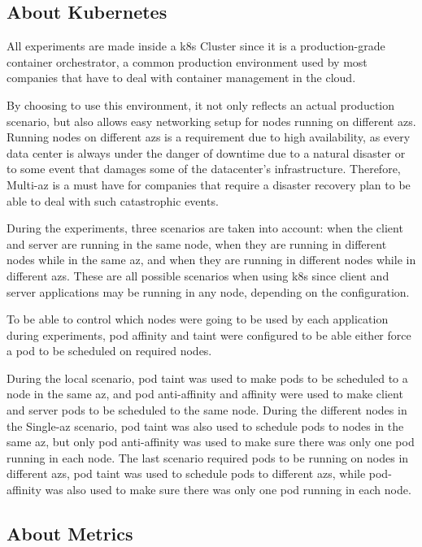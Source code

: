 \subsection{About Kubernetes}

All experiments are made inside a \gls{k8s} Cluster since it is a production-grade container orchestrator, a common production environment used by most companies that have to deal with container management in the cloud.

By choosing to use this environment, it not only reflects an actual production scenario, but also allows easy networking setup for nodes running on different \gls{az}s. Running nodes on different \gls{az}s is a requirement due to high availability, as every data center is always under the danger of downtime due to a natural disaster or to some event that damages some of the datacenter’s infrastructure. Therefore, Multi-\gls{az} is a must have for companies that require a disaster recovery plan to be able to deal with such catastrophic events.

During the experiments, three scenarios are taken into account: when the client and server are running in the same node, when they are running in different nodes while in the same \gls{az}, and when they are running in different nodes while in different \gls{az}s. These are all possible scenarios when using \gls{k8s} since client and server applications may be running in any node, depending on the configuration.

To be able to control which nodes were going to be used by each application during experiments, pod affinity and taint were configured to be able either force a pod to be scheduled on required nodes.

During the local scenario, pod taint was used to make pods to be scheduled to a node in the same \gls{az}, and pod anti-affinity and affinity were used to make client and server pods to be scheduled to the same node. During the different nodes in the Single-\gls{az} scenario, pod taint was also used to schedule pods to nodes in the same \gls{az}, but only pod anti-affinity was used to make sure there was only one pod running in each node. The last scenario required pods to be running on nodes in different \gls{az}s, pod taint was used to schedule pods to different \gls{az}s, while pod-affinity was also used to make sure there was only one pod running in each node.

\subsection{About Metrics}


